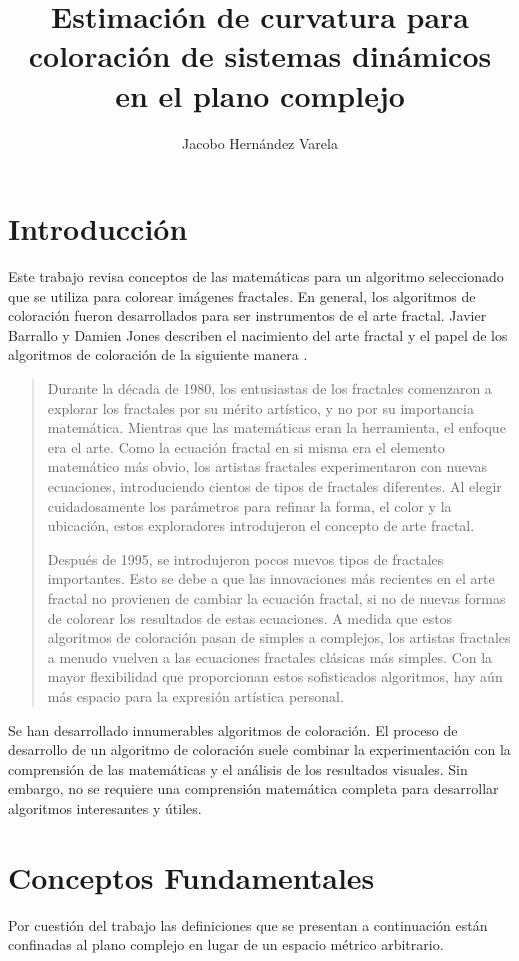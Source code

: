 \documentclass[12pt,letterpaper,final]{article}
\author{Jacobo Hernández Varela}
\title{Estimación de curvatura para coloración de sistemas dinámicos en el plano complejo}
\theoremstyle{plain}
\theoremstyle{definition}
\theoremstyle{remark}
\numberwithin{equation}{section}
\begin{document}
\maketitle
\tableofcontents
\section{Introducción}
Este trabajo revisa conceptos de las matemáticas para un algoritmo seleccionado que se utiliza para colorear imágenes fractales. En general, los algoritmos de coloración fueron desarrollados para ser instrumentos de el arte fractal. Javier Barrallo y Damien Jones describen el nacimiento del arte fractal y el papel de los algoritmos de coloración de la siguiente manera \cite{Coloring Algorithms}.

\begin{quote}
Durante la década de 1980, los entusiastas de los fractales comenzaron a explorar los fractales por su mérito artístico, y no por su importancia matemática. Mientras que las matemáticas eran la herramienta, el enfoque era el arte. Como la ecuación fractal en si misma era el elemento matemático más obvio, los artistas fractales experimentaron con nuevas ecuaciones, introduciendo cientos de tipos de fractales diferentes. Al elegir cuidadosamente los parámetros para refinar la forma, el color y la ubicación, estos exploradores introdujeron el concepto de arte fractal.

Después de 1995, se introdujeron pocos nuevos tipos de fractales importantes. Esto se debe a que las innovaciones más recientes en el arte fractal no provienen de cambiar la ecuación fractal, si no de nuevas formas de colorear los resultados de estas ecuaciones. A medida que estos algoritmos de coloración pasan de simples a complejos, los artistas fractales a menudo vuelven a las ecuaciones fractales clásicas más simples. Con la mayor flexibilidad que proporcionan estos sofisticados algoritmos, hay aún más espacio para la expresión artística personal.
\end{quote}

Se han desarrollado innumerables algoritmos de coloración. El proceso de desarrollo de un algoritmo de coloración suele combinar la experimentación con la comprensión de las matemáticas y el análisis de los resultados visuales. Sin embargo, no se requiere una comprensión matemática completa para desarrollar algoritmos interesantes y útiles.

\section{Conceptos Fundamentales}
Por cuestión del trabajo las definiciones que se presentan a continuación están confinadas al plano complejo en lugar de un espacio métrico arbitrario.
\end{document}
